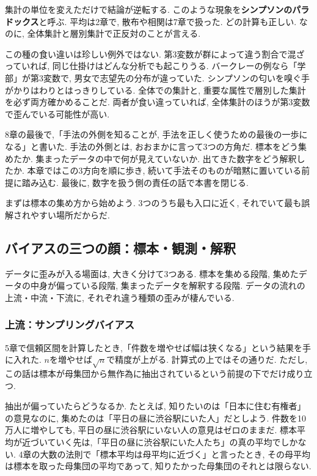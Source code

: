集計の単位を変えただけで結論が逆転する.
このような現象を\textbf{シンプソンのパラドックス}と呼ぶ.
平均は2章で, 散布や相関は7章で扱った. どの計算も正しい.
なのに, 全体集計と層別集計で正反対のことが言える.

この種の食い違いは珍しい例外ではない.
第3変数が群によって違う割合で混ざっていれば, 同じ仕掛けはどんな分析でも起こりうる.
バークレーの例なら「学部」が第3変数で, 男女で志望先の分布が違っていた.
シンプソンの匂いを嗅ぐ手がかりはわりとはっきりしている. 全体での集計と, 重要な属性で層別した集計を必ず両方確かめることだ.
両者が食い違っていれば, 全体集計のほうが第3変数で歪んでいる可能性が高い.

8章の最後で,「手法の外側を知ることが, 手法を正しく使うための最後の一歩になる」と書いた.
手法の外側とは, おおまかに言って3つの方角だ.
標本をどう集めたか. 集まったデータの中で何が見えていないか. 出てきた数字をどう解釈したか.
本章ではこの3方向を順に歩き, 続いて手法そのものが暗黙に置いている前提に踏み込む.
最後に, 数字を扱う側の責任の話で本書を閉じる.

まずは標本の集め方から始めよう.
3つのうち最も入口に近く, それでいて最も誤解されやすい場所だからだ.


\subsection{バイアスの三つの顔：標本・観測・解釈}

データに歪みが入る場面は, 大きく分けて3つある.
標本を集める段階, 集めたデータの中身が偏っている段階, 集まったデータを解釈する段階.
データの流れの上流・中流・下流に, それぞれ違う種類の歪みが棲んでいる.

\subsubsection*{上流：サンプリングバイアス}

5章で信頼区間を計算したとき,「件数を増やせば幅は狭くなる」という結果を手に入れた.
$n$を増やせば$\sqrt{n}$で精度が上がる. 計算式の上ではその通りだ.
ただし, この話は標本が母集団から無作為に抽出されているという前提の下でだけ成り立つ.

抽出が偏っていたらどうなるか.
たとえば, 知りたいのは「日本に住む有権者」の意見なのに, 集めたのは「平日の昼に渋谷駅にいた人」だとしよう.
件数を10万人に増やしても, 平日の昼に渋谷駅にいない人の意見はゼロのままだ.
標本平均が近づいていく先は,「平日の昼に渋谷駅にいた人たち」の真の平均でしかない.
4章の大数の法則で「標本平均は母平均に近づく」と言ったとき, その母平均は標本を取った母集団の平均であって, 知りたかった母集団のそれとは限らない.

